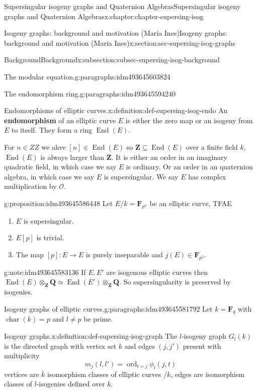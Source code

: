 \documentclass[oneside,10pt,]{book}
\newcommand{\terminology}[1]{\textbf{#1}}
\numberwithin{equation}{section}
\newcommand{\lb}{[}
\newcommand{\rb}{]}
\newcommand{\ZZ}{\mathbf{Z}}
\newcommand{\QQ}{\mathbf{Q}}
\newcommand{\FF}{\mathbf{F}}
\newcommand{\ints}{\mathcal{O}}
\DeclareMathOperator{\End}{End}
\DeclareMathOperator{\characteristic}{char}
\DeclareMathOperator{\ord}{ord}
\begin{document}
\begin{chapterptx}{Supersingular isogeny graphs and Quaternion Algebras}{}{Supersingular isogeny graphs and Quaternion Algebras}{}{}{x:chapter:chapter-supersing-isog}
\begin{sectionptx}{Isogeny graphs: background and motivation (Maria Ines)}{}{Isogeny graphs: background and motivation (Maria Ines)}{}{}{x:section:sec-supersing-isog-graphs}
\begin{subsectionptx}{Background}{}{Background}{}{}{x:subsection:subsec-supersing-isog-background}
\begin{paragraphs}{The modular equation.}{g:paragraphs:idm493645603824}
\end{paragraphs}%
\begin{paragraphs}{The endomorphism ring.}{g:paragraphs:idm493645594240}%
\begin{definition}{Endomorphisms of elliptic curves.}{x:definition:def-supersing-isog-endo}%
An \terminology{endomorphism} of an elliptic curve \(E\) is either the zero map or an isogeny from \(E\) to itself. They form a ring \(\End(E)\).%
\end{definition}
For \(n \in ZZ\) we ahve \(\lb n \rb \in \End(E)\) so \(\ZZ \subseteq \End(E)\) over a finite field \(k\), \(\End(E)\) is always larger than \(\ZZ\). It is either an order in an imaginary quadratic field, in which case we say \(E\) is ordinary. Or an order in an quaternion algebra, in which case we say \(E\) is supersingular. We say \(E\) has complex multiplication by \(\ints\).%
\begin{proposition}{}{}{g:proposition:idm493645586448}%
Let \(E/k = \FF_{p^n}\) be an elliptic curve, TFAE%
\begin{enumerate}
\item{}\(E\) is supersingular.%
\item{}\(E\lb p\rb\) is trivial.%
\item{}The map \(\lb p\rb \colon E\to E\) is purely inseparable and \(j(E) \in \FF_{p^2}\).%
\end{enumerate}
%
\end{proposition}
\begin{note}{}{g:note:idm493645583136}%
If \(E,E'\) are isogenous elliptic curves then \(\End(E) \otimes_\ZZ \QQ \simeq \End(E')\otimes_\ZZ \QQ\). So supersingularity is preserved by isogenies.%
\end{note}
\end{paragraphs}%
\begin{paragraphs}{Isogeny graphs of elliptic curves.}{g:paragraphs:idm493645581792}%
Let \(k = \FF_q\) with \(\characteristic(k) = p\) and \(l \ne p \) be prime.%
\begin{definition}{Isogeny graphs.}{x:definition:def-supersing-isog-graph}%
The \(l\)-isogeny graph \(G_l(k)\) is the directed graph with vertex set \(k\) and edges \((j,j')\) present with multiplicity%
\begin{equation*}
m_j(l,l') = \ord_{t=j} \phi_l(j,t)
\end{equation*}
vertices are \(\overline k\) isomorphism classes of  elliptic curves \(/k\), edges are isomorphism classes of \(l\)-isogenies defined over \(k\).%
\end{definition}

\end{paragraphs}
\end{subsectionptx}
\end{sectionptx}
\end{chapterptx}
\end{document}

